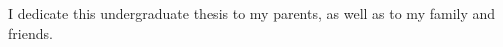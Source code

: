 \vspace{7cm}

\begin{center}
	

	I dedicate this undergraduate thesis to my parents, as well as to my family and friends.
		
\end{center}


